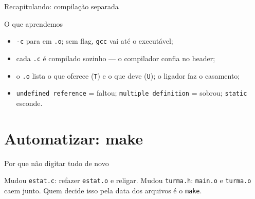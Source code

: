 \documentclass[aspectratio=169]{beamer}
\begin{document}
\begin{frame}{Recapitulando: compilação separada}
  \begin{block}{O que aprendemos}
    \begin{itemize}
      \item \texttt{-c} para em \texttt{.o}; sem flag, \texttt{gcc} vai até o
        executável;
      \item cada \texttt{.c} é compilado sozinho --- o compilador confia no
        header;
      \item o \texttt{.o} lista o que oferece (\texttt{T}) e o que deve
        (\texttt{U}); o ligador faz o casamento;
      \item \texttt{undefined reference} = faltou; \texttt{multiple definition}
        = sobrou; \texttt{static} esconde.
    \end{itemize}
  \end{block}
\end{frame}

\section{Automatizar: make}

\begin{frame}{Por que não digitar tudo de novo}
  \begin{center}
  \end{center}
  \begin{block}{}
    \small Mudou \texttt{estat.c}: refazer \texttt{estat.o} e religar. Mudou
    \texttt{turma.h}: \texttt{main.o} e \texttt{turma.o} caem junto. Quem
    decide isso pela data dos arquivos é o \texttt{make}.
  \end{block}
\end{frame}
\end{document}
